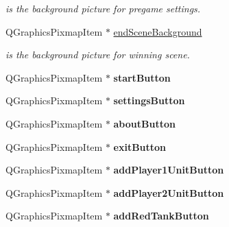 \begin{DoxyCompactItemize}
\begin{DoxyCompactList}\small\item\em is the background picture for pregame settings. \end{DoxyCompactList}\item 
Q\+Graphics\+Pixmap\+Item $\ast$ \hyperlink{class_game_menu_a32c0e1b35559b840ffc5628cb59c8639}{end\+Scene\+Background}\hypertarget{class_game_menu_a32c0e1b35559b840ffc5628cb59c8639}{}\label{class_game_menu_a32c0e1b35559b840ffc5628cb59c8639}

\begin{DoxyCompactList}\small\item\em is the background picture for winning scene. \end{DoxyCompactList}\item 
Q\+Graphics\+Pixmap\+Item $\ast$ {\bfseries start\+Button}\hypertarget{class_game_menu_a22c3e73fc24f9699e6a9f4bc1d6fbd52}{}\label{class_game_menu_a22c3e73fc24f9699e6a9f4bc1d6fbd52}

\item 
Q\+Graphics\+Pixmap\+Item $\ast$ {\bfseries settings\+Button}\hypertarget{class_game_menu_aca49d1e3a9dfec037cbc85a01cb6df82}{}\label{class_game_menu_aca49d1e3a9dfec037cbc85a01cb6df82}

\item 
Q\+Graphics\+Pixmap\+Item $\ast$ {\bfseries about\+Button}\hypertarget{class_game_menu_a3d6ca189f02e14ed5cfb5451526a271b}{}\label{class_game_menu_a3d6ca189f02e14ed5cfb5451526a271b}

\item 
Q\+Graphics\+Pixmap\+Item $\ast$ {\bfseries exit\+Button}\hypertarget{class_game_menu_a76bcbc6a772fb628f39140c9365eccd8}{}\label{class_game_menu_a76bcbc6a772fb628f39140c9365eccd8}

\item 
Q\+Graphics\+Pixmap\+Item $\ast$ {\bfseries add\+Player1\+Unit\+Button}\hypertarget{class_game_menu_aedcd8869665d66f9489ab41f0c038df8}{}\label{class_game_menu_aedcd8869665d66f9489ab41f0c038df8}

\item 
Q\+Graphics\+Pixmap\+Item $\ast$ {\bfseries add\+Player2\+Unit\+Button}\hypertarget{class_game_menu_a1027a5d9f67523cee6782d6413a75281}{}\label{class_game_menu_a1027a5d9f67523cee6782d6413a75281}

\item 
Q\+Graphics\+Pixmap\+Item $\ast$ {\bfseries add\+Red\+Tank\+Button}\hypertarget{class_game_menu_aab61d7c4576ad32880dd7ef88ed20ec8}{}\label{class_game_menu_aab61d7c4576ad32880dd7ef88ed20ec8}


\end{DoxyCompactItemize}
